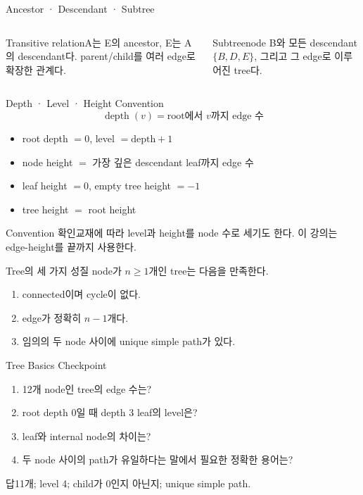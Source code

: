 \begin{frame}{Ancestor · Descendant · Subtree}
\begin{columns}[T]
\begin{block}{Transitive relation}A는 E의 ancestor, E는 A의 descendant다. parent/child를 여러 edge로 확장한 관계다.\end{block}
\begin{block}{Subtree}node B와 모든 descendant $\{B,D,E\}$, 그리고 그 edge로 이루어진 tree다.\end{block}
\end{columns}
\end{frame}
\begin{frame}{Depth · Level · Height Convention}
\[
\operatorname{depth}(v)=\text{root에서 }v\text{까지 edge 수}
\]
\begin{itemize}
\item root depth $=0$, level $=\text{depth}+1$
\item node height $=$ 가장 깊은 descendant leaf까지 edge 수
\item leaf height $=0$, empty tree height $=-1$
\item tree height $=$ root height
\end{itemize}
\begin{alertblock}{Convention 확인}교재에 따라 level과 height를 node 수로 세기도 한다. 이 강의는 edge-height를 끝까지 사용한다.\end{alertblock}
\end{frame}
\begin{frame}{Tree의 세 가지 성질}
node가 $n\ge1$개인 tree는 다음을 만족한다.
\begin{enumerate}
\item connected이며 cycle이 없다.
\item edge가 정확히 $n-1$개다.
\item 임의의 두 node 사이에 unique simple path가 있다.
\end{enumerate}
\end{frame}
\begin{frame}{Tree Basics Checkpoint}
\begin{enumerate}
\item 12개 node인 tree의 edge 수는?
\item root depth 0일 때 depth 3 leaf의 level은?
\item leaf와 internal node의 차이는?
\item 두 node 사이의 path가 유일하다는 말에서 필요한 정확한 용어는?
\end{enumerate}
\begin{exampleblock}{답}11개; level 4; child가 0인지 아닌지; unique simple path.\end{exampleblock}
\end{frame}
